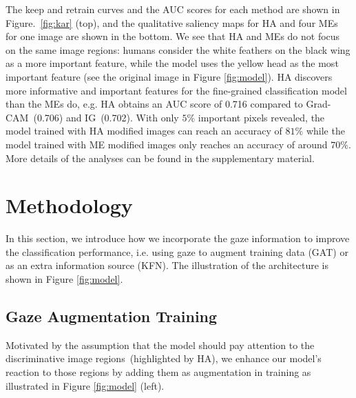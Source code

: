 \documentclass{bmvc2k}
\begin{document}
The keep and retrain curves and the AUC scores for each method are shown in Figure.\ \ref{fig:kar} (top), and the qualitative saliency maps for HA and four MEs for one image are shown in the bottom. We see that HA and MEs do not focus on the same image regions: humans consider the white feathers on the black wing as a more important feature, while the model uses the yellow head as the most important feature (see the original image in Figure \ref{fig:model}). HA discovers more informative and important features for the fine-grained classification model than the MEs do, e.g. HA obtains an AUC score of 0.716 compared to Grad-CAM~(0.706) and IG~(0.702). With only $5\%$ important pixels revealed, the model trained with HA modified images can reach an accuracy of $81\%$ while the model trained with ME modified images only reaches an accuracy of around $70\%$. 
More details of the analyses can be found in the supplementary material.

















\section{Methodology}
In this section, we introduce how we incorporate the gaze information to improve the classification performance, i.e. using gaze to augment training data (GAT) or as an extra information source (KFN). The illustration of the architecture is shown in Figure \ref{fig:model}.


\subsection{Gaze Augmentation Training}
Motivated by the assumption that the model should pay attention to the discriminative image regions~(highlighted by HA), we enhance our model's reaction to those regions by adding them as augmentation in training as illustrated in Figure \ref{fig:model} (left).
\end{document}
